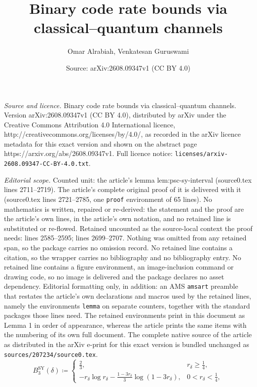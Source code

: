 \documentclass[10pt,a4paper]{amsart}
\title{Binary code rate bounds via classical--quantum channels}
\author{Omar Alrabiah, Venkatesan Guruswami}
\date{Source: arXiv:2608.09347v1 (CC BY 4.0)}
\renewcommand{\geq}{\geqslant}
\begin{document}
\maketitle

\noindent\emph{Source and licence.} Binary code rate bounds via classical--quantum channels. Version arXiv:2608.09347v1 (CC BY 4.0), distributed by arXiv under the Creative Commons Attribution 4.0 International licence, http://creativecommons.org/licenses/by/4.0/, as recorded in the arXiv licence metadata for this exact version and shown on the abstract page https://arxiv.org/abs/2608.09347v1. Full licence notice: \texttt{licenses/arxiv-2608.09347-CC-BY-4.0.txt}.\par\smallskip

\noindent\textit{Editorial scope.} Counted unit: the article's lemma lem:psc-sy-interval (source0.tex lines 2711--2719). The article's complete original proof of it is delivered with it (source0.tex lines 2721--2785, one \texttt{proof} environment of 65 lines). No mathematics is written, repaired or re-derived: the statement and the proof are the article's own lines, in the article's own notation, and no retained line is substituted or re-flowed.  Retained uncounted as the source-local context the proof needs: lines 2585--2595; lines 2699--2707.  Nothing was omitted from any retained span, so the package carries no omission record.  No retained line contains a citation, so the wrapper carries no bibliography and no bibliography entry.  No retained line contains a figure environment, an image-inclusion command or drawing code, so no image is delivered and the package declares no asset dependency.  Editorial formatting only, in addition: an AMS \texttt{amsart} preamble that restates the article's own declarations and macros used by the retained lines, namely the environments \texttt{lemma} on separate counters, together with the standard packages those lines need.  The retained environments print in this document as Lemma 1 in order of appearance, whereas the article prints the same items with the numbering of its own full document.  The complete native source of the article as distributed in the arXiv e-print for this exact version is bundled unchanged as \texttt{sources/207234/source0.tex}.
\begin{equation}
\label{eq:sy-ldpc-base}
B_3^{\mathrm{SY}}(\delta)
\coloneqq
\begin{cases}
\frac{2}{3}, & r_\delta \geq \frac{1}{4}, \\
-r_\delta\log{r_\delta}
-\frac{1-3r_\delta}{3}\log(1-3r_\delta),
& 0 < r_\delta < \frac{1}{4},
\end{cases}
\end{equation}
\end{document}

